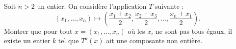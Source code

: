 Soit $n > 2$ un entier. On considère l'application $T$ suivante :
\[
(x_1, \ldots, x_n) \mapsto \left(\frac{x_1 + x_2}{2}, \frac{x_2 + x_3}{2}, \ldots, \frac{x_n + x_1}{2}\right).
\]
Montrer que pour tout $x = (x_1, \ldots, x_n)$ où les $x_i$ ne sont pas tous égaux, il existe un entier $k$ tel que $T^k(x)$ ait une composante non entière.
